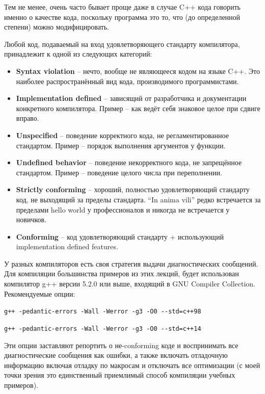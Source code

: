 \documentclass[a4paper,12pt,oneside]{article}
\begin{document}
Тем не менее, очень часто бывает проще даже в случае C++ кода говорить именно о качестве кода, поскольку программа это то, что (до определенной степени) можно модифицировать.

Любой код, подаваемый на вход удовлетворяющего стандарту компилятора, принадлежит к одной из следующих категорий:

\begin{itemize}
\item
 \textbf{Syntax violation} -- нечто, вообще не являющееся кодом на языке C++. Это наиболее распространённый вид кода, производимого программистами.
\item
 \textbf{Implementation defined} – зависящий от разработчика и документации конкретного компилятора. Пример – как ведёт себя знаковое целое при сдвиге вправо.
\item
 \textbf{Unspecified} – поведение корректного кода, не регламентированное стандартом. 
 Пример – порядок выполнения аргументов у функции.
\item
 \textbf{Undefined behavior} – поведение некорректного кода, не запрещённое стандартом. 
 Пример – поведение целого числа при переполнении.
\item
 \textbf{Strictly conforming} – хороший, полностью удовлетворяющий стандарту код, не выходящий за пределы стандарта. ``In anima vili'' редко встречается за пределами hello world у профессионалов и никогда не встречается у новичков.
\item
 \textbf{Conforming} – код удовлетворяющий стандарту + использующий implementation defined features.
\end{itemize}

У разных компиляторов есть своя стратегия выдачи диагностических сообщений. Для компиляции большинства примеров из этих лекций, будет использован компилятор g++ версии 5.2.0 или выше, входящий в GNU Compiler Collection. Рекомендуемые опции: 

\lstinline!g++ -pedantic-errors -Wall -Werror -g3 -O0 --std=c++98!

\lstinline!g++ -pedantic-errors -Wall -Werror -g3 -O0 --std=c++14!

Эти опции заставляют репортить о не-conforming коде и воспринимать все диагностические сообщения как ошибки, а также включать отладочную информацию включая отладку по макросам и отключать все оптимизации (с моей точки зрения это единственный приемлимый способ компиляции учебных примеров).
\end{document}
